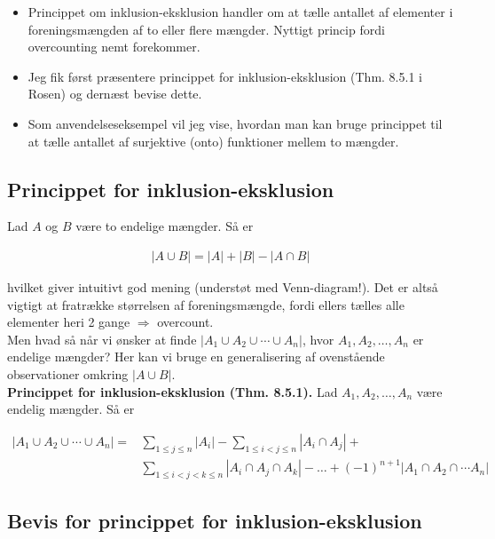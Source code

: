 \documentclass[12pt]{article}
\begin{document}
\begin{itemize}
    \item Princippet om inklusion-eksklusion handler om at tælle antallet af elementer i foreningsmængden af to eller flere mængder. Nyttigt princip fordi overcounting nemt forekommer. 
    \item Jeg fik først præsentere princippet for inklusion-eksklusion (Thm. 8.5.1 i Rosen) og dernæst bevise dette.
    \item Som anvendelseseksempel vil jeg vise, hvordan man kan bruge princippet til at tælle antallet af surjektive (onto) funktioner mellem to mængder.
\end{itemize}

\subsection*{Princippet for inklusion-eksklusion}

Lad $A$ og $B$ være to endelige mængder. Så er 

\begin{align*}
    |A \cup B| = |A| + |B| - |A \cap B|
\end{align*}

hvilket giver intuitivt god mening (understøt med Venn-diagram!). Det er altså vigtigt at fratrække størrelsen af foreningsmængde, fordi ellers tælles alle elementer heri 2 gange $\Rightarrow$ overcount.\\

Men hvad så når vi ønsker at finde $|A_1 \cup A_2 \cup \cdots \cup A_n|$, hvor $A_1, A_2, \ldots,A_n$ er endelige mængder? Her kan vi bruge en generalisering af ovenstående observationer omkring $|A \cup B|$. \\

\textbf{Princippet for inklusion-eksklusion (Thm. 8.5.1).} Lad $A_1, A_2, \ldots, A_n$ være endelig mængder. Så er 

\begin{align*}
    |A_1 \cup A_2 \cup \cdots \cup A_n| =& \sum_{1 \le j \le n} |A_i| - \sum_{1\le i < j\le n} |A_i \cap A_j| + \\
    &\sum_{1 \le i < j < k \le n} |A_i \cap A_j \cap A_k|- \ldots + (-1)^{n+1} |A_1 \cap A_2 \cap \cdots A_n|
\end{align*}

\subsection*{Bevis for princippet for inklusion-eksklusion} 
\end{document}
